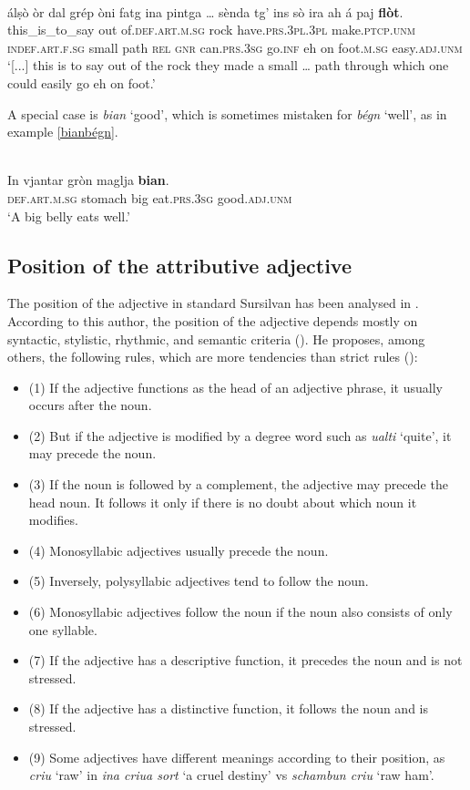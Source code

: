 \ea\label{}
\\
\gll  [...] álṣò òr dal grép òni fatg ina pintga …  sènda tg’ ins sò ira ah á paj \textbf{flòt}.\\
{} this\_is\_to\_say out of.\textsc{def.art.m.sg} rock have.\textsc{prs.3pl.3pl} make.\textsc{ptcp.unm} \textsc{indef.art.f.sg} small {} path \textsc{rel} \textsc{gnr} can.\textsc{prs.3sg} go.\textsc{inf} eh on foot.\textsc{m.sg} easy.\textsc{adj.unm} \\
\glt `[...] this is to say out of the rock they made a small … path through which one could easily go eh on foot.'
\z

A special case is \textit{bian} `good', which is sometimes mistaken for \textit{bégn} `well', as in example {\ref{bianbégn}}.

\ea\label{bianbégn}
\\
\gll  In vjantar gròn maglja \textbf{bian}. \\
     \textsc{def.art.m.sg} stomach big eat.\textsc{prs.3sg} good.\textsc{adj.unm} \\
\glt `A big belly eats well.'
\z

\subsection{Position of the attributive adjective}
The position of the adjective in standard Sursilvan has been analysed in \citet{Winzap1981}. According to this author, the position of the adjective depends mostly on syntactic, stylistic, rhythmic, and semantic criteria (\citet[1]{Winzap1981}). He proposes, among others, the following rules, which are more tendencies than strict rules (\citet[3ff.]{Winzap1981}): 

\begin{itemize}
\item (1) If the adjective functions as the head of an adjective phrase, it usually occurs after the noun.
\item (2) But if the adjective is modified by a degree word such as \textit{ualti} `quite', it may precede the noun.
\item (3) If the noun is followed by a complement, the adjective may precede the head noun. It follows it only if there is no doubt about which noun it modifies.
\item (4) Monosyllabic adjectives usually precede the noun.
\item (5) Inversely, polysyllabic adjectives tend to follow the noun.
\item (6) Monosyllabic adjectives follow the noun if the noun also consists of only one syllable.
\item (7) If the adjective has a descriptive function, it precedes the noun and is not stressed.
\item (8) If the adjective has a distinctive function, it follows the noun and is stressed.
\item (9) Some adjectives have different meanings according to their position, as \textit{criu} `raw' in \textit{ina criua sort} `a cruel destiny' vs \textit{schambun criu} `raw ham'.
\end{itemize}	

